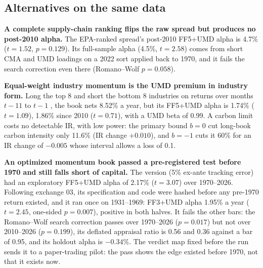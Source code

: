 \begin{table}[!tb]
\caption{The frozen 1994--2009 test: the pre-registered pass bar for the EMV-share rule and, for context, our team's own signal lagged one month. All four components had to pass; both signals fail.}
\label{tab:frozen}
\centering\scriptsize
\setlength{\tabcolsep}{3.5pt}

\end{table}

\subsection{Alternatives on the same data}
\label{sec:alternatives}

\textbf{A complete supply-chain ranking flips the raw spread but produces no post-2010 alpha.} The EPA-ranked spread's post-2010 FF5+UMD alpha is 4.7\% ($t=1.52$, $p=0.129$). Its full-sample alpha (4.5\%, $t=2.58$) comes from short CMA and UMD loadings on a 2022 sort applied back to 1970, and it fails the search correction even there (Romano--Wolf $p=0.058$).

\textbf{Equal-weight industry momentum is the UMD premium in industry form.} Long the top 8 and short the bottom 8 industries on returns over months $t-11$ to $t-1$ \citep{mg1999}, the book nets 8.52\% a year, but its FF5+UMD alpha is 1.74\% ($t=1.09$), 1.86\% since 2010 ($t=0.71$), with a UMD beta of 0.99. A carbon limit costs no detectable IR, with low power: the primary bound $b=0$ cut long-book carbon intensity only 11.6\% (IR change $+0.010$), and $b=-1$ cuts it 60\% for an IR change of $-0.005$ whose interval allows a loss of 0.1.

\textbf{An optimized momentum book passed a pre-registered test before 1970 and still falls short of capital.} The \citet{gk2000} version (5\% ex-ante tracking error) had an exploratory FF5+UMD alpha of 2.17\% ($t=3.07$) over 1970--2026. Following exchange 03, its specification and code were hashed before any pre-1970 return existed, and it ran once on 1931--1969: FF3+UMD alpha 1.95\% a year ($t=2.45$, one-sided $p=0.007$), positive in both halves. It fails the other bars: the Romano--Wolf search correction \citep{rw2005} passes over 1970--2026 ($p=0.017$) but not over 2010--2026 ($p=0.199$), its deflated appraisal ratio \citep{bldp2014} is 0.56 and 0.36 against a bar of 0.95, and its holdout alpha is $-0.34$\%. The verdict map fixed before the run sends it to a paper-trading pilot: the pass shows the edge existed before 1970, not that it exists now.

